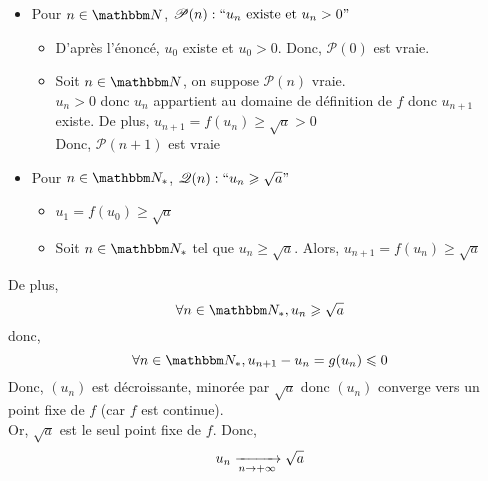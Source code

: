 \begin{itemize}
	\item Pour $n \in \N$, $\mathcal{P}(n): ``u_n \text{ existe et } u_n > 0"$ 
		\begin{itemize}
			\item D'après l'énoncé, $u_0$ existe et $u_0 > 0$. Donc, $\mathcal{P}(0)$ est vraie.
			\item Soit $n \in \N$, on suppose $\mathcal{P}(n)$ vraie.\\
				$u_n > 0$ donc $u_n$ appartient au domaine de définition de $f$ donc $u_{n+1}$ existe. De plus, $u_{n+1} = f(u_n) \ge  \sqrt{a} > 0$\\
				Donc, $\mathcal{P}(n+1)$ est vraie
		\end{itemize}
	\item Pour $n \in \N_*$, $\mathcal{Q}(n): ``u_n \ge \sqrt{a}"$ 
		\begin{itemize}
			\item $u_1 = f(u_0) \ge \sqrt{a}$
			\item Soit  $n \in \N_*$ tel que $u_n \ge \sqrt{a}$. Alors, $u_{n+1} = f(u_n) \ge \sqrt{a}$
		\end{itemize}
\end{itemize}
\vspace{5mm}

De plus, \[
	\forall n \in \N_*, u_n \ge \sqrt{a}
\] donc, \[
\forall n \in \N_*, u_{n+1} - u_n = g(u_n) \le 0
\]
Donc, $(u_n)$ est décroissante, minorée par $\sqrt{a}$ donc $(u_n)$ converge vers un point fixe de $f$ (car $f$ est continue).\\
Or, $\sqrt{a}$ est le seul point fixe de $f$. Donc, \[
	u_n \tendsto{n \to +\infty} \sqrt{a}
\]

